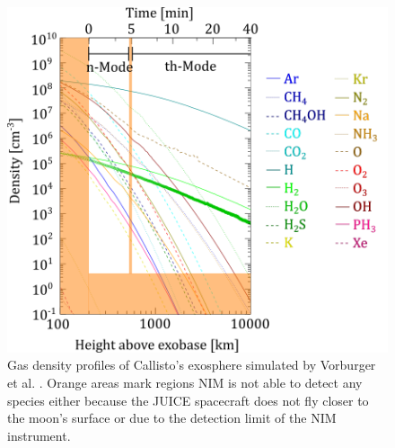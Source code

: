 	\begin{figure}[h!]
		\centering
		\includegraphics[width=.7\textwidth]{Bilder/Vorburger_Icarus_2015.png}
		\caption{Gas density profiles of Callisto's exosphere simulated by Vorburger et al. \cite{Vorburger2015}. Orange areas mark regions NIM is not able to detect any species either because the JUICE spacecraft does not fly closer to the moon's surface or due to the detection limit of the NIM instrument.} %
		\label{fig:VorburgIc2015}
	\end{figure}
